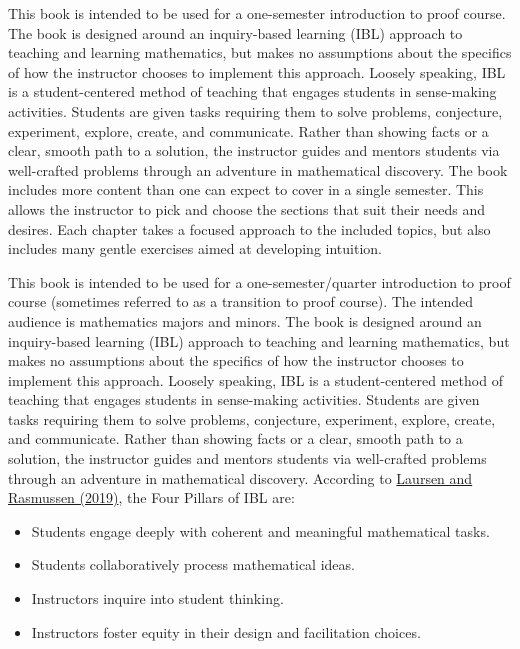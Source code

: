 This book is intended to be used for a one-semester introduction to proof course. The book is designed around an inquiry-based learning (IBL) approach to teaching and learning mathematics, but makes no assumptions about the specifics of how the instructor chooses to implement this approach.  Loosely speaking, IBL is a student-centered method of teaching that engages students in sense-making activities.  Students are given tasks requiring them to solve problems, conjecture, experiment, explore, create, and communicate.  Rather than showing facts or a clear, smooth path to a solution, the instructor guides and mentors students via well-crafted problems through an adventure in mathematical discovery. The book includes more content than one can expect to cover in a single semester. This allows the instructor to pick and choose the sections that suit their needs and desires. Each chapter takes a focused approach to the included topics, but also includes many gentle exercises aimed at developing intuition.


This book is intended to be used for a one-semester/quarter introduction to proof course (sometimes referred to as a transition to proof course). The intended audience is mathematics majors and minors. The book is designed around an inquiry-based learning (IBL) approach to teaching and learning mathematics, but makes no assumptions about the specifics of how the instructor chooses to implement this approach.  Loosely speaking, IBL is a student-centered method of teaching that engages students in sense-making activities.  Students are given tasks requiring them to solve problems, conjecture, experiment, explore, create, and communicate.  Rather than showing facts or a clear, smooth path to a solution, the instructor guides and mentors students via well-crafted problems through an adventure in mathematical discovery.  According to \href{https://www.colorado.edu/eer/sites/default/files/attached-files/laursenrasmussencommentaryauthorversion0219.pdf}{Laursen and Rasmussen (2019)}, the Four Pillars of IBL are:
\begin{itemize}
\item Students engage deeply with coherent and meaningful mathematical tasks.
\item Students collaboratively process mathematical ideas.
\item Instructors inquire into student thinking.
\item Instructors foster equity in their design and facilitation choices.
\end{itemize}

